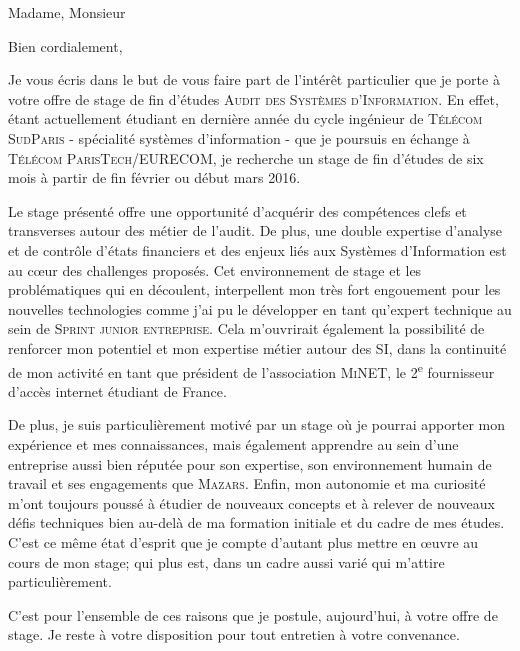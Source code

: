 \documentclass[10pt,a4paper,roman]{moderncv} %
\begin{document}
\date{23 Novembre 2015} %
\opening{Madame, Monsieur} %

\closing{Bien cordialement,} %


\makelettertitle %


\quad \quad Je vous écris dans le but de vous faire part de l'intérêt particulier que je porte à votre offre de stage de fin d'études
\textsc{Audit des Systèmes d’Information}. En effet, étant actuellement étudiant en dernière année du cycle
ingénieur de \textsc{Télécom SudParis} - spécialité systèmes d'information - que je poursuis en échange à
\textsc{Télécom ParisTech}/\textsc{EURECOM}, je recherche un stage de fin d’études de six mois à partir de fin février ou début mars 2016.

\quad \quad Le stage présenté offre une opportunité d'acquérir des compétences clefs et transverses autour des métier de l'audit.
De plus, une double expertise d’analyse et de contrôle d’états financiers et des enjeux liés aux Systèmes d’Information est au c\oe ur des challenges proposés.
Cet environnement de stage et les problématiques qui en découlent, interpellent mon très fort engouement pour les nouvelles
technologies comme j'ai pu le développer en tant qu'expert technique au sein de \textsc{Sprint junior entreprise}.
Cela m'ouvrirait également la possibilité de renforcer mon potentiel et mon expertise métier autour des SI, dans la continuité de mon
activité en tant que président de l'association \textsc{MiNET}, le 2\textsuperscript{e} fournisseur d'accès internet étudiant de France.

\quad \quad De plus, je suis particulièrement motivé par un stage où je pourrai apporter mon expérience et mes connaissances, mais également
apprendre au sein d'une entreprise aussi bien réputée pour son expertise, son environnement humain de travail et ses engagements que \textsc{Mazars}.
Enfin, mon autonomie et ma curiosité m'ont toujours poussé à étudier de nouveaux concepts et à relever de nouveaux défis techniques bien au-delà de ma
formation initiale et du cadre de mes études. C'est ce même état d'esprit que je compte d'autant plus mettre en \oe uvre au cours de mon stage;
qui plus est, dans un cadre aussi varié qui m'attire particulièrement.

\quad \quad C’est pour l’ensemble de ces raisons que je postule, aujourd'hui, à votre offre de stage. Je reste à votre disposition pour
tout entretien à votre convenance.
\\[0.7cm]


\makeletterclosing %

\end{document}
